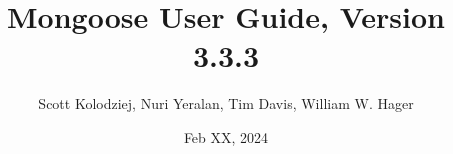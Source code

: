 \title{Mongoose User Guide, Version 3.3.3}
\author{Scott Kolodziej, Nuri Yeralan, Tim Davis, William W. Hager}
\date{Feb XX, 2024}
